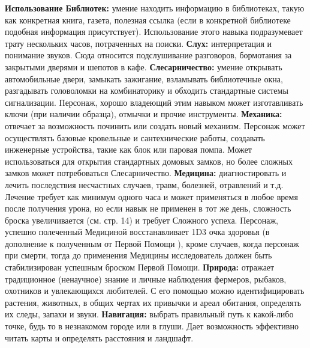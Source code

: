\documentclass[letterpaper,twocolumn,openany, twoside, 11pt, usenames]{cocbook}
\begin{document}
\begin{fullcocpaperbox}{}{}
  \begin{multicols}{3}
  \textbf{Использование Библиотек:} умение находить информацию в библиотеках, такую как конкретная книга, газета, полезная ссылка (если в конкретной библиотеке подобная информация присутствует). Использование этого навыка подразумевает трату нескольких часов, потраченных на поиски.
  \smallbreak
  \textbf{Слух:} интерпретация и понимание звуков. Сюда относится подслушивание разговоров, бормотания за закрытыми дверями и шепотов в кафе.
  \smallbreak
  \textbf{Слесарничество:} умение открывать автомобильные двери, замыкать зажигание, взламывать библиотечные окна, разгадывать головоломки на комбинаторику и обходить стандартные системы сигнализации. Персонаж, хорошо владеющий этим навыком может изготавливать ключи (при наличии образца), отмычки и прочие инструменты.
  \smallbreak
  \textbf{Механика:} отвечает за возможность починить или создать новый механизм. Персонаж может осуществлять базовые кровельные и сантехнические работы, создавать инженерные устройства, такие как блок или паровая помпа. Может использоваться для открытия стандартных домовых замков, но более сложных замков может потребоваться Слесарничество.
  \smallbreak
  \textbf{Медицина:} диагностировать и лечить последствия несчастных случаев, травм, болезней, отравлений и т.д. Лечение требует как минимум одного часа и может применяться в любое время после получения урона, но если навык не применен в тот же день, сложность броска увеличивается (см. стр. 14) и требует Сложного успеха. Персонаж, успешно полеченный Медициной восстанавливает 1D3 очка здоровья (в дополнение к полученным от Первой Помощи ), кроме случаев, когда персонаж при смерти, тогда до применения Медицины исследователь должен быть стабилизирован успешным броском Первой Помощи.
  \smallbreak
  \textbf{Природа:} отражает традиционное (ненаучное) знание и личные наблюдения фермеров, рыбаков, охотников и увлекающихся любителей. С его помощью можно идентифицировать растения, животных, в общих чертах их привычки и ареал обитания, определять их следы, запахи и звуки.
  \smallbreak
  \textbf{Навигация:} выбрать правильный путь к какой-либо точке, будь то в незнакомом городе или в глуши. Дает возможность эффективно читать карты и определять расстояния и ландшафт.

\end{multicols}
\end{fullcocpaperbox}
\end{document}
